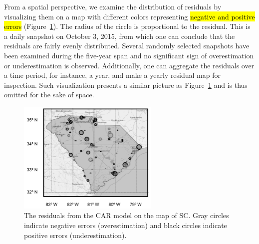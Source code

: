 From a spatial perspective, we examine the distribution of residuals by visualizing them on a map with different colors representing \hl{negative and positive errors} (Figure~\ref{fig:spatial_resid}).
The radius of the circle is proportional to the residual.
This is a daily snapshot on October 3, 2015, from which one can conclude that the residuals are fairly evenly distributed.
Several randomly selected snapshots have been examined during the five-year span and no significant sign of overestimation or underestimation is observed.
 Additionally, one can  aggregate the residuals over a time period, for instance, a year, and make a yearly residual map for inspection.
 Such visualization presents a similar picture as Figure~\ref{fig:spatial_resid} and is thus omitted for the sake of space. \\

\begin{figure}
 \begin{center}
\includegraphics[width=0.6\textwidth]{../images/residuals_on_map.png}
\caption{The residuals from the CAR model on the map of SC. Gray circles indicate negative errors (overestimation) and black circles indicate positive errors (underestimation).}
\label{fig:spatial_resid}
 \end{center}
\end{figure}

